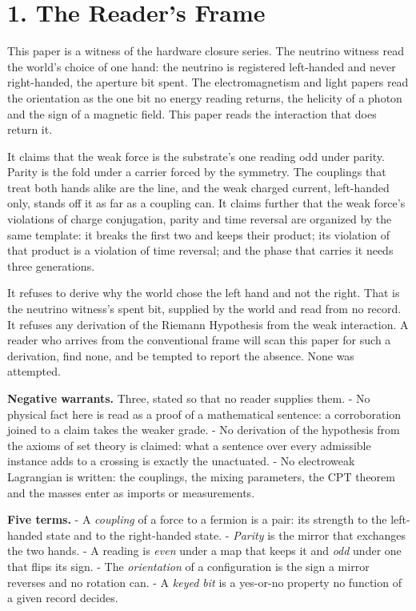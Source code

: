 \documentclass[10pt]{article}
\begin{document}
\hypertarget{the-readers-frame}{%
\section{1. The Reader's Frame}\label{the-readers-frame}}

This paper is a witness of the hardware closure series. The neutrino
witness read the world's choice of one hand: the neutrino is registered
left-handed and never right-handed, the aperture bit spent. The
electromagnetism and light papers read the orientation as the one bit no
energy reading returns, the helicity of a photon and the sign of a
magnetic field. This paper reads the interaction that does return it.

It claims that the weak force is the substrate's one reading odd under
parity. Parity is the fold under a carrier forced by the symmetry. The
couplings that treat both hands alike are the line, and the weak charged
current, left-handed only, stands off it as far as a coupling can. It
claims further that the weak force's violations of charge conjugation,
parity and time reversal are organized by the same template: it breaks
the first two and keeps their product; its violation of that product is
a violation of time reversal; and the phase that carries it needs three
generations.

It refuses to derive why the world chose the left hand and not the
right. That is the neutrino witness's spent bit, supplied by the world
and read from no record. It refuses any derivation of the Riemann
Hypothesis from the weak interaction. A reader who arrives from the
conventional frame will scan this paper for such a derivation, find
none, and be tempted to report the absence. None was attempted.

\textbf{Negative warrants.} Three, stated so that no reader supplies
them. - No physical fact here is read as a proof of a mathematical
sentence: a corroboration joined to a claim takes the weaker grade. - No
derivation of the hypothesis from the axioms of set theory is claimed:
what a sentence over every admissible instance adds to a crossing is
exactly the unactuated. - No electroweak Lagrangian is written: the
couplings, the mixing parameters, the CPT theorem and the masses enter
as imports or measurements.

\textbf{Five terms.} - A \emph{coupling} of a force to a fermion is a
pair: its strength to the left-handed state and to the right-handed
state. - \emph{Parity} is the mirror that exchanges the two hands. - A
reading is \emph{even} under a map that keeps it and \emph{odd} under
one that flips its sign. - The \emph{orientation} of a configuration is
the sign a mirror reverses and no rotation can. - A \emph{keyed bit} is
a yes-or-no property no function of a given record decides.
\end{document}
